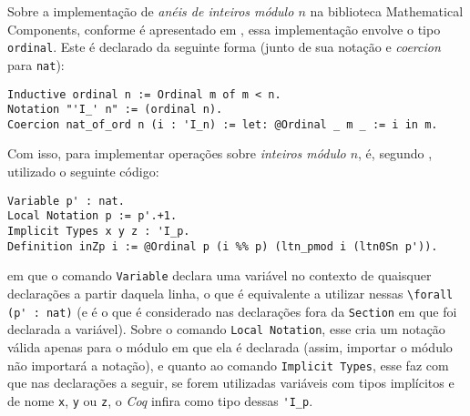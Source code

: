 Sobre a implementação de \textit{anéis de inteiros módulo $n$} na biblioteca Mathematical Components, conforme é apresentado em \cite[p.~145]{assia_mahboubi_2022_7118596}, essa implementação envolve o tipo \lstinline[language = coq]{ordinal}. Este é declarado da seguinte forma (junto de sua notação e \textit{coercion} para \lstinline[language=coq]|nat|):
    \begin{lstlisting}[language=coq,frame=single,tabsize=1]
Inductive ordinal n := Ordinal m of m < n.
Notation "'I_' n" := (ordinal n).
Coercion nat_of_ord n (i : 'I_n) := let: @Ordinal _ m _ := i in m.
    \end{lstlisting}
Com isso, para implementar operações sobre \textit{inteiros módulo $n$}, é, segundo \cite{assia_mahboubi_2022_7118596}, utilizado o seguinte código:
    \begin{lstlisting}[language=coq,frame=single,tabsize=1]
Variable p' : nat.
Local Notation p := p'.+1.
Implicit Types x y z : 'I_p.
Definition inZp i := @Ordinal p (i %% p) (ltn_pmod i (ltn0Sn p')).
    \end{lstlisting}
em que o comando \lstinline[language = coq]{Variable} declara uma variável no contexto de quaisquer declarações a partir daquela linha, o que é equivalente a utilizar nessas \lstinline[language = coq]{\forall (p' : nat)} (e é o que é considerado nas declarações fora da \lstinline[language = coq]{Section} em que foi declarada a variável). Sobre o comando \lstinline[language = coq]{Local Notation}, esse cria um notação válida apenas para o módulo em que ela é declarada (assim, importar o módulo não importará a notação), e quanto ao comando \lstinline[language = coq]{Implicit Types}, esse faz com que nas declarações a seguir, se forem utilizadas variáveis com tipos implícitos e de nome \lstinline[language = coq]{x}, \lstinline[language = coq]{y} ou \lstinline[language = coq]{z}, o \textit{Coq} infira como tipo dessas \lstinline[language = coq]{'I_p}.


